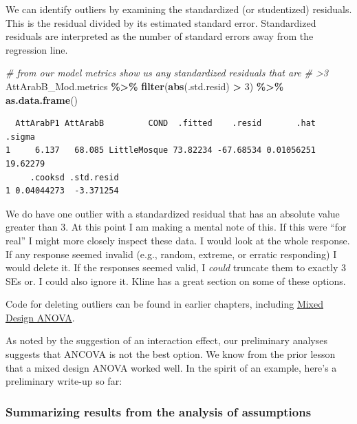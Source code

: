 \documentclass[
  11pt,
]{book}
\newenvironment{Shaded}{\begin{snugshade}}{\end{snugshade}}
\newcommand{\CommentTok}[1]{\textcolor[rgb]{0.37,0.37,0.37}{\textit{#1}}}
\newcommand{\DecValTok}[1]{\textcolor[rgb]{0.06,0.06,0.06}{#1}}
\newcommand{\FunctionTok}[1]{\textcolor[rgb]{0.27,0.27,0.27}{\textbf{#1}}}
\newcommand{\NormalTok}[1]{#1}
\newcommand{\SpecialCharTok}[1]{\textcolor[rgb]{0.43,0.43,0.43}{\textbf{#1}}}
\begin{document}
We can identify outliers by examining the standardized (or studentized) residuals. This is the residual divided by its estimated standard error. Standardized residuals are interpreted as the number of standard errors away from the regression line.

\begin{Shaded}
\begin{Highlighting}[]
\CommentTok{\# from our model metrics show us any standardized residuals that are}
\CommentTok{\# \textgreater{}3}
\NormalTok{AttArabB\_Mod.metrics }\SpecialCharTok{\%\textgreater{}\%}
    \FunctionTok{filter}\NormalTok{(}\FunctionTok{abs}\NormalTok{(.std.resid) }\SpecialCharTok{\textgreater{}} \DecValTok{3}\NormalTok{) }\SpecialCharTok{\%\textgreater{}\%}
    \FunctionTok{as.data.frame}\NormalTok{()}
\end{Highlighting}
\end{Shaded}

\begin{verbatim}
  AttArabP1 AttArabB         COND  .fitted    .resid       .hat   .sigma
1     6.137   68.085 LittleMosque 73.82234 -67.68534 0.01056251 19.62279
     .cooksd .std.resid
1 0.04044273  -3.371254
\end{verbatim}

We do have one outlier with a standardized residual that has an absolute value greater than 3. At this point I am making a mental note of this. If this were ``for real'' I might more closely inspect these data. I would look at the whole response. If any response seemed invalid (e.g., random, extreme, or erratic responding) I would delete it. If the responses seemed valid, I \emph{could} truncate them to exactly 3 SEs or. I could also ignore it. Kline \citeyearpar{kline_data_2016} has a great section on some of these options.

Code for deleting outliers can be found in earlier chapters, including \protect\hyperlink{Mixed}{Mixed Design ANOVA}.

As noted by the suggestion of an interaction effect, our preliminary analyses suggests that ANCOVA is not the best option. We know from the prior lesson that a mixed design ANOVA worked well. In the spirit of an example, here's a preliminary write-up so far:

\hypertarget{summarizing-results-from-the-analysis-of-assumptions-3}{%
\subsubsection{Summarizing results from the analysis of assumptions}\label{summarizing-results-from-the-analysis-of-assumptions-3}}
\end{document}
